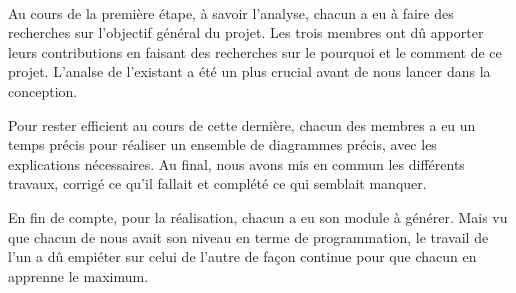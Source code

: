 \paragraph{}
Au cours de la première étape, à savoir l'analyse, chacun a eu à faire des recherches
sur l'objectif général du projet. Les trois membres ont dû apporter leurs contributions
en faisant des recherches sur le pourquoi et le comment de ce projet. L'analse de
l'existant a été un plus crucial avant de nous lancer dans la conception. \par 
Pour rester efficient au cours de cette dernière, chacun des membres a eu un temps précis
pour réaliser un ensemble de diagrammes précis, avec les explications nécessaires. Au final,
nous avons mis en commun les différents travaux, corrigé ce qu'il fallait et complété ce
qui semblait manquer. \par 
En fin de compte, pour la réalisation, chacun a eu son module à générer. Mais vu que 
chacun de nous avait son niveau en terme de programmation, le travail de l'un a dû 
empiéter sur celui de l'autre de façon continue pour que chacun en apprenne le 
maximum.